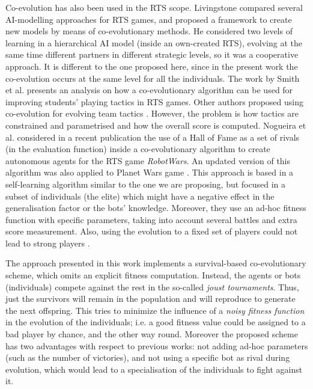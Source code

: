 \documentclass[conference]{IEEEtran}
\begin{document}
Co-evolution has also been used in the RTS scope. Livingstone \cite{Livinstone_RTS2005} compared several AI-modelling approaches for RTS games, and proposed a framework to create new models by means of co-evolutionary methods. He considered two levels of learning in a hierarchical AI model (inside an own-created RTS), evolving at the same time different partners in different strategic levels, so it was a cooperative approach. It is different to the one proposed here, since in the present work the co-evolution occurs at the same level for all the individuals.
The work by Smith et al. \cite{Smith_RTS_SpatialTactics2010} presents an analysis on how a co-evolutionary algorithm can be used for improving students' playing tactics in RTS games. Other authors proposed using co-evolution for evolving team tactics \cite{Avery_RTS_Team2010}. However, the problem is how tactics are constrained and parametrised and how the overall score is computed.
Nogueira et al. \cite{Nogueira_HoF2013} considered in a recent
publication the use of a Hall of Fame as a set of rivals (in the
evaluation function) inside a co-evolutionary algorithm to create
autonomous agents for the RTS game {\em RobotWars}. An updated version of this algorithm was also applied to Planet Wars game \cite{NogueiraCoevolutionary14}. This approach is based in a self-learning algorithm similar to the one we are proposing, but focused in a subset of individuals (the elite) which might have a negative effect in the generalisation factor or the bots' knowledge. Moreover, they use an ad-hoc fitness function with specific parameters, taking into account several battles and extra score measurement. Also, using the evolution to a fixed set of players could not lead to strong players \cite{Coevolving13Samothrakis}.

The approach presented in this work implements a survival-based co-evolutionary scheme, which omits an explicit fitness computation. Instead, the agents or bots (individuals) compete against the rest in the so-called \textit{joust tournaments}. Thus, just the survivors will remain in the population and will reproduce to generate the next offspring.
This tries to minimize the influence of a \textit{noisy fitness function} \cite{Genebot_JCST} in the evolution of the individuals; i.e. a good fitness value could be assigned to a bad player by chance, and the other way round. Moreover the proposed scheme has two advantages with respect to previous works: not adding ad-hoc parameters (such as the number of victories), and not using a specific bot as rival during evolution, which would lead to a specialisation of the individuals to fight against it.
\end{document}
